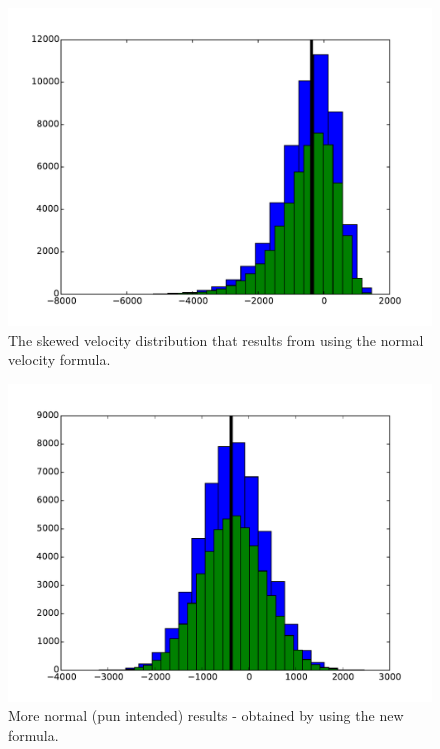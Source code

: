 \documentclass[usenatbib]{mn2e}
\begin{document}
\begin{figure}
  \begin{center}
  \includegraphics[scale=0.4]{11-23-velocity-normal-est-redo.pdf}
  \end{center}
\caption{\small
The skewed velocity distribution that results from using the normal velocity formula.
}
\label{fig:normalest}
\end{figure}

\begin{figure}
  \begin{center}
  \includegraphics[scale=0.4]{11-23-velocity-feldman-simple-est.pdf}
  \end{center}
\caption{\small
More normal (pun intended) results - obtained by using the new formula.
}
\label{fig:feldmanest}
\end{figure}
\end{document}

